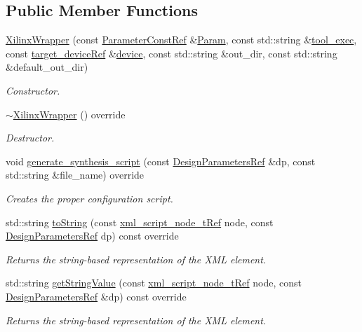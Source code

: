 \subsection*{Public Member Functions}
\begin{DoxyCompactItemize}
\item 
\hyperlink{classXilinxWrapper_ab6102041bdfe5263be75e5d65685ccc2}{Xilinx\+Wrapper} (const \hyperlink{Parameter_8hpp_a37841774a6fcb479b597fdf8955eb4ea}{Parameter\+Const\+Ref} \&\hyperlink{classSynthesisTool_a854ef102782ff4d069e1aa6d1a94d64e}{Param}, const std\+::string \&\hyperlink{classSynthesisTool_a78fd58496215c69838de4269204804a5}{tool\+\_\+exec}, const \hyperlink{target__device_8hpp_acedb2b7a617e27e6354a8049fee44eda}{target\+\_\+device\+Ref} \&\hyperlink{classSynthesisTool_a07bf37421c6cff80ba70682ea2b2e3ae}{device}, const std\+::string \&out\+\_\+dir, const std\+::string \&default\+\_\+out\+\_\+dir)
\begin{DoxyCompactList}\small\item\em Constructor. \end{DoxyCompactList}\item 
\hyperlink{classXilinxWrapper_a49cac83ef2023618b5007e35ef589a32}{$\sim$\+Xilinx\+Wrapper} () override
\begin{DoxyCompactList}\small\item\em Destructor. \end{DoxyCompactList}\item 
void \hyperlink{classXilinxWrapper_a535252db25a8a37fd956ee1915c760e2}{generate\+\_\+synthesis\+\_\+script} (const \hyperlink{DesignParameters_8hpp_ae36bb1c4c9150d0eeecfe1f96f42d157}{Design\+Parameters\+Ref} \&dp, const std\+::string \&file\+\_\+name) override
\begin{DoxyCompactList}\small\item\em Creates the proper configuration script. \end{DoxyCompactList}\item 
std\+::string \hyperlink{classXilinxWrapper_abda54a2f377b1570bf7c045713557edf}{to\+String} (const \hyperlink{xml__script__command_8hpp_a1fe3d50ade66bc35e41be9b68bbbcd02}{xml\+\_\+script\+\_\+node\+\_\+t\+Ref} node, const \hyperlink{DesignParameters_8hpp_ae36bb1c4c9150d0eeecfe1f96f42d157}{Design\+Parameters\+Ref} dp) const override
\begin{DoxyCompactList}\small\item\em Returns the string-\/based representation of the X\+ML element. \end{DoxyCompactList}\item 
std\+::string \hyperlink{classXilinxWrapper_a1a3f3f256c4552c913ad26396a7f3bab}{get\+String\+Value} (const \hyperlink{xml__script__command_8hpp_a1fe3d50ade66bc35e41be9b68bbbcd02}{xml\+\_\+script\+\_\+node\+\_\+t\+Ref} node, const \hyperlink{DesignParameters_8hpp_ae36bb1c4c9150d0eeecfe1f96f42d157}{Design\+Parameters\+Ref} \&dp) const override
\begin{DoxyCompactList}\small\item\em Returns the string-\/based representation of the X\+ML element. \end{DoxyCompactList}\end{DoxyCompactItemize}
